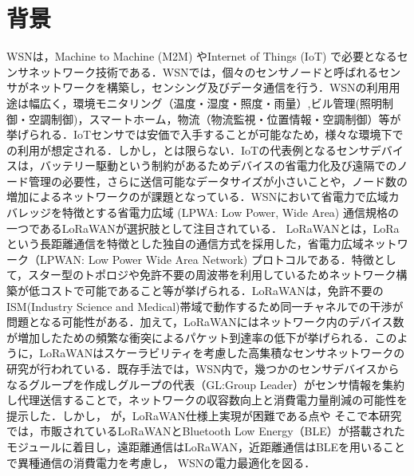 \section{背景}
WSNは，Machine to Machine (M2M) やInternet of Things (IoT) で必要となるセンサネットワーク技術である．WSNでは，個々のセンサノードと呼ばれるセンサがネットワークを構築し，センシング及びデータ通信を行う．WSNの利用用途は幅広く，環境モニタリング（温度・湿度・照度・雨量）,ビル管理(照明制御・空調制御)，スマートホーム，物流（物流監視・位置情報・空調制御）等が挙げられる\cite{Farooq2018}．IoTセンサでは安価で入手することが可能なため，様々な環境下での利用が想定される．しかし，とは限らない．IoTの代表例となるセンサデバイスは，バッテリー駆動という制約があるためデバイスの省電力化及び遠隔でのノード管理の必要性，さらに送信可能なデータサイズが小さいことや，ノード数の増加によるネットワークのが課題となっている．WSNにおいて省電力で広域カバレッジを特徴とする省電力広域 (LPWA: Low Power, Wide Area) 通信規格の一つであるLoRaWANが選択肢として注目されている．
LoRaWANとは，LoRaという長距離通信を特徴とした独自の通信方式を採用した，省電力広域ネットワーク（LPWAN: Low Power Wide Area Network) プロトコルである．特徴として，スター型のトポロジや免許不要の周波帯を利用しているためネットワーク構築が低コストで可能であること等が挙げられる．LoRaWANは，免許不要のISM(Industry Science and Medical)帯域で動作するため同一チャネルでの干渉が問題となる可能性がある\cite{Adelantado2017}．加えて，LoRaWANにはネットワーク内のデバイス数が増加したための頻繁な衝突によるパケット到達率の低下が挙げられる．このように，LoRaWANはスケーラビリティを考慮した高集積なセンサネットワークの研究が行われている．既存手法では，WSN内で，幾つかのセンサデバイスからなるグループを作成しグループの代表（GL:Group Leader）がセンサ情報を集約し代理送信することで，ネットワークの収容数向上と消費電力量削減の可能性を提示した．しかし，
が，LoRaWAN仕様上実現が困難である点や
そこで本研究では，市販されているLoRaWANとBluetooth Low Energy（BLE）が搭載されたモジュールに着目し，遠距離通信はLoRaWAN，近距離通信はBLEを用いることで異種通信の消費電力を考慮し，
WSNの電力最適化を図る．
